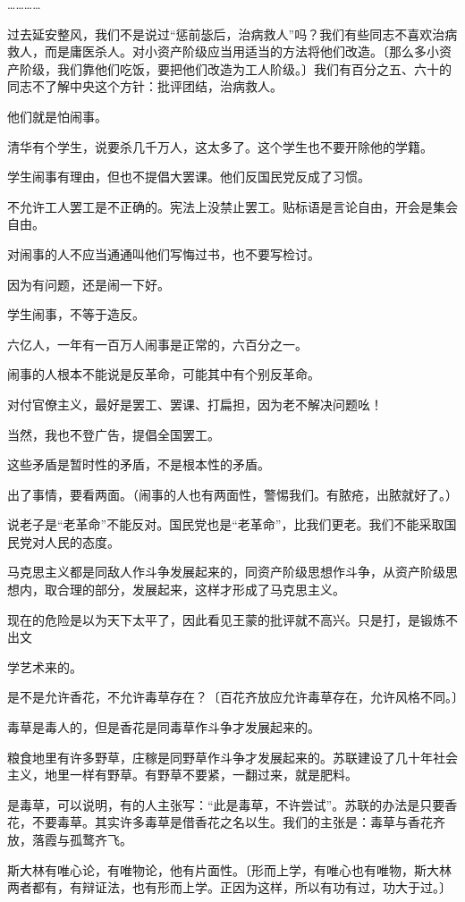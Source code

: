 …………

过去延安整风，我们不是说过“惩前毖后，治病救人”吗？我们有些同志不喜欢治病救人，而是庸医杀人。对小资产阶级应当用适当的方法将他们改造。〔那么多小资产阶级，我们靠他们吃饭，要把他们改造为工人阶级。〕我们有百分之五、六十的同志不了解中央这个方针：批评团结，治病救人。

他们就是怕闹事。

清华有个学生，说要杀几千万人，这太多了。这个学生也不要开除他的学籍。

学生闹事有理由，但也不提倡大罢课。他们反国民党反成了习惯。

不允许工人罢工是不正确的。宪法上没禁止罢工。贴标语是言论自由，开会是集会自由。

对闹事的人不应当通通叫他们写悔过书，也不要写检讨。

因为有问题，还是闹一下好。

学生闹事，不等于造反。

六亿人，一年有一百万人闹事是正常的，六百分之一。

闹事的人根本不能说是反革命，可能其中有个别反革命。

对付官僚主义，最好是罢工、罢课、打扁担，因为老不解决问题吆！

当然，我也不登广告，提倡全国罢工。

这些矛盾是暂时性的矛盾，不是根本性的矛盾。

出了事情，要看两面。（闹事的人也有两面性，警惕我们。有脓疮，出脓就好了。）

说老子是“老革命”不能反对。国民党也是“老革命”，比我们更老。我们不能采取国民党对人民的态度。

马克思主义都是同敌人作斗争发展起来的，同资产阶级思想作斗争，从资产阶级思想内，取合理的部分，发展起来，这样才形成了马克思主义。

现在的危险是以为天下太平了，因此看见王蒙的批评就不高兴。只是打，是锻炼不出文

学艺术来的。

是不是允许香花，不允许毒草存在？〔百花齐放应允许毒草存在，允许风格不同。〕

毒草是毒人的，但是香花是同毒草作斗争才发展起来的。

粮食地里有许多野草，庄稼是同野草作斗争才发展起来的。苏联建设了几十年社会主义，地里一样有野草。有野草不要紧，一翻过来，就是肥料。

是毒草，可以说明，有的人主张写：“此是毒草，不许尝试”。苏联的办法是只要香花，不要毒草。其实许多毒草是借香花之名以生。我们的主张是：毒草与香花齐放，落霞与孤鹜齐飞。

斯大林有唯心论，有唯物论，他有片面性。〔形而上学，有唯心也有唯物，斯大林两者都有，有辩证法，也有形而上学。正因为这样，所以有功有过，功大于过。〕

